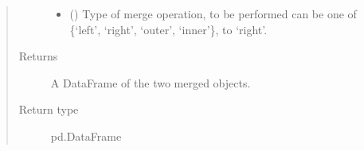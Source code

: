 \documentclass[letterpaper,10pt,english]{sphinxmanual}
\begin{document}
\begin{fulllineitems}
\begin{quote}
\begin{description}
\begin{itemize}
\item {} 
 (\sphinxstyleliteralemphasis{\sphinxupquote{, }}) \textendash{} Type of merge operation, to be performed can be one of \{‘left’,
‘right’, ‘outer’, ‘inner’\}, to ‘right’.

\end{itemize}

\item[{Returns}] \leavevmode
A DataFrame of the two merged objects.

\item[{Return type}] \leavevmode
pd.DataFrame

\end{description}\end{quote}

\end{fulllineitems}

\end{document}
